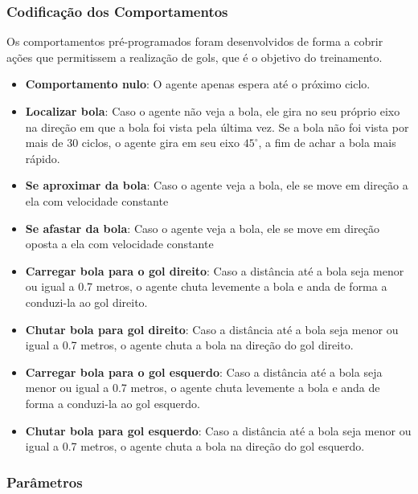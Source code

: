 \subsubsection{Codificação dos Comportamentos}
\label{subsubsec:behaviors-mapping}
Os comportamentos pré-programados foram desenvolvidos de forma a cobrir ações que permitissem a realização de gols, que é o objetivo do treinamento.

\begin{itemize}
	
	\item \textbf{Comportamento nulo}: O agente apenas espera até o próximo ciclo.
	
	\item \textbf{Localizar bola}: Caso o agente não veja a bola, ele gira no seu próprio eixo na direção em que a bola foi vista pela última vez. Se a bola não foi vista por mais de 30 ciclos, o agente gira em seu eixo $45^{\circ}$, a fim de achar a bola mais rápido. 
	
	\item \textbf{Se aproximar da bola}: Caso o agente veja a bola, ele se move em direção a ela com velocidade constante
	
	\item \textbf{Se afastar da bola}: Caso o agente veja a bola, ele se move em direção oposta a ela com velocidade constante
	
	\item \textbf{Carregar bola para o gol direito}: Caso a distância até a bola seja menor ou igual a 0.7 metros, o agente chuta levemente a bola e anda de forma a conduzi-la ao gol direito.
	
	\item \textbf{Chutar bola para gol direito}: Caso a distância até a bola seja menor ou igual a 0.7 metros, o agente chuta a bola na direção do gol direito.
	
	\item \textbf{Carregar bola para o gol esquerdo}: Caso a distância até a bola seja menor ou igual a 0.7 metros, o agente chuta levemente a bola e anda de forma a conduzi-la ao gol esquerdo.
	
	\item \textbf{Chutar bola para gol esquerdo}: Caso a distância até a bola seja menor ou igual a 0.7 metros, o agente chuta a bola na direção do gol esquerdo.
	
\end{itemize}

\subsubsection{Parâmetros}
\label{subsubsec:sarsa-params}

